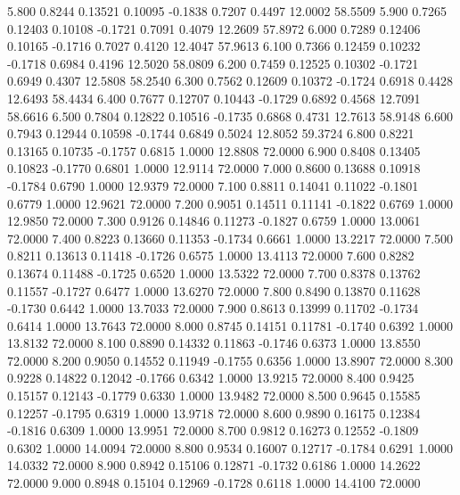    5.800   0.8244   0.13521   0.10095  -0.1838   0.7207   0.4497  12.0002  58.5509
   5.900   0.7265   0.12403   0.10108  -0.1721   0.7091   0.4079  12.2609  57.8972
   6.000   0.7289   0.12406   0.10165  -0.1716   0.7027   0.4120  12.4047  57.9613
   6.100   0.7366   0.12459   0.10232  -0.1718   0.6984   0.4196  12.5020  58.0809
   6.200   0.7459   0.12525   0.10302  -0.1721   0.6949   0.4307  12.5808  58.2540
   6.300   0.7562   0.12609   0.10372  -0.1724   0.6918   0.4428  12.6493  58.4434
   6.400   0.7677   0.12707   0.10443  -0.1729   0.6892   0.4568  12.7091  58.6616
   6.500   0.7804   0.12822   0.10516  -0.1735   0.6868   0.4731  12.7613  58.9148
   6.600   0.7943   0.12944   0.10598  -0.1744   0.6849   0.5024  12.8052  59.3724
   6.800   0.8221   0.13165   0.10735  -0.1757   0.6815   1.0000  12.8808  72.0000
   6.900   0.8408   0.13405   0.10823  -0.1770   0.6801   1.0000  12.9114  72.0000
   7.000   0.8600   0.13688   0.10918  -0.1784   0.6790   1.0000  12.9379  72.0000
   7.100   0.8811   0.14041   0.11022  -0.1801   0.6779   1.0000  12.9621  72.0000
   7.200   0.9051   0.14511   0.11141  -0.1822   0.6769   1.0000  12.9850  72.0000
   7.300   0.9126   0.14846   0.11273  -0.1827   0.6759   1.0000  13.0061  72.0000
   7.400   0.8223   0.13660   0.11353  -0.1734   0.6661   1.0000  13.2217  72.0000
   7.500   0.8211   0.13613   0.11418  -0.1726   0.6575   1.0000  13.4113  72.0000
   7.600   0.8282   0.13674   0.11488  -0.1725   0.6520   1.0000  13.5322  72.0000
   7.700   0.8378   0.13762   0.11557  -0.1727   0.6477   1.0000  13.6270  72.0000
   7.800   0.8490   0.13870   0.11628  -0.1730   0.6442   1.0000  13.7033  72.0000
   7.900   0.8613   0.13999   0.11702  -0.1734   0.6414   1.0000  13.7643  72.0000
   8.000   0.8745   0.14151   0.11781  -0.1740   0.6392   1.0000  13.8132  72.0000
   8.100   0.8890   0.14332   0.11863  -0.1746   0.6373   1.0000  13.8550  72.0000
   8.200   0.9050   0.14552   0.11949  -0.1755   0.6356   1.0000  13.8907  72.0000
   8.300   0.9228   0.14822   0.12042  -0.1766   0.6342   1.0000  13.9215  72.0000
   8.400   0.9425   0.15157   0.12143  -0.1779   0.6330   1.0000  13.9482  72.0000
   8.500   0.9645   0.15585   0.12257  -0.1795   0.6319   1.0000  13.9718  72.0000
   8.600   0.9890   0.16175   0.12384  -0.1816   0.6309   1.0000  13.9951  72.0000
   8.700   0.9812   0.16273   0.12552  -0.1809   0.6302   1.0000  14.0094  72.0000
   8.800   0.9534   0.16007   0.12717  -0.1784   0.6291   1.0000  14.0332  72.0000
   8.900   0.8942   0.15106   0.12871  -0.1732   0.6186   1.0000  14.2622  72.0000
   9.000   0.8948   0.15104   0.12969  -0.1728   0.6118   1.0000  14.4100  72.0000
